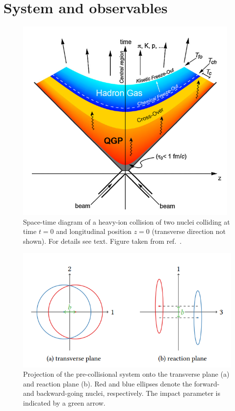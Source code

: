 \documentclass[a4paper,12pt]{book}
\begin{document}
\section{System and observables}

\begin{figure}
	\begin{center}
		\centering
		\includegraphics[width=0.6\linewidth]{images/collision_Phase.png}
		\caption{Space-time diagram of a heavy-ion collision of two nuclei colliding at time $t=0$ and longitudinal
position $z=0$ (transverse direction not shown). For details see text. Figure taken from ref.~\parencite{BRAUNMUNZINGER2019144}.}
		\label{fig:collision}
	\end{center}
\end{figure}

\begin{figure}
	\begin{center}
		\centering
		\includegraphics[width=0.8\linewidth]{images/collision_axes.png}
		\caption{Projection of the pre-collisional system onto the transverse plane (a) and reaction plane (b). Red and blue ellipses denote the forward- and backward-going
nuclei, respectively. The impact parameter is indicated by a green arrow.}
		\label{fig:collision_axes}
	\end{center}
\end{figure}
\end{document}
